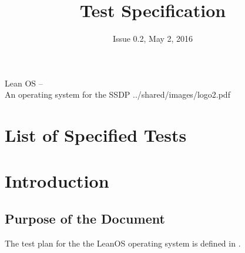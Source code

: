 

\title{Test Specification}
\def \documentid {LEANOS-UVIE-TS-001}
\date{Issue 0.2, May 2, 2016}

\newcommand\affil[1]{\textsuperscript#1}

\def\preparedby {Armin Luntzer\affil{1}}
\def\checkedby {Roland Ottensamer\affil{1}}
\def\approvedby {Franz Kerschbaum\affil{1}}

\def\affiliations{
	\affil{1} Department of Astrophysics, University of Vienna
}






\usepackage{vhistory}

\usepackage{biblatex}







\rereadauxdesignlabels





\setmainfont{MyriadPro-SemiCondensed}
\uvietitlepage%
{Lean OS --\\ An operating system for the SSDP}%
{\doctitle}%
{../shared/images/logo2.pdf}
\setmainfont{MyriadPro}

\approvalpage

\tableofcontents
\newpage


\chapter*{List of Specified Tests}
\label{listoftests}
\the\designlist


\begin{versionhistory}
\end{versionhistory}


\chapter{Introduction}


\section{Purpose of the Document}

The test plan for the the LeanOS operating system is defined in
\cite{leanosTP}.\\
\\

